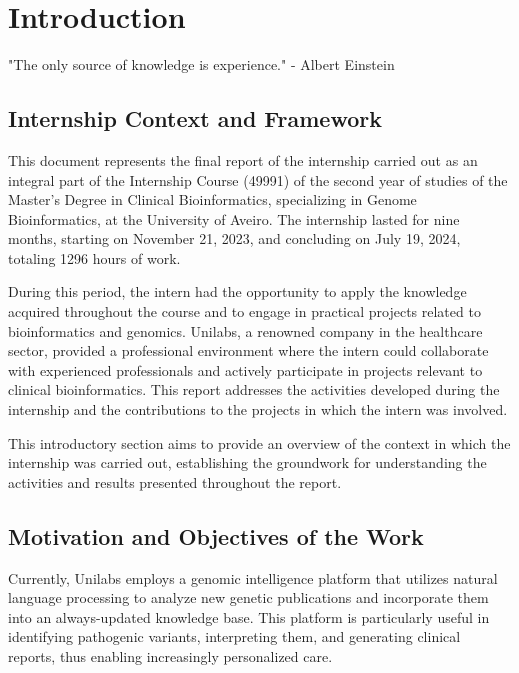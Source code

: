 \chapter{Introduction}
\label{chapter:introduction}

\begin{introduction}
    "The only source of knowledge is experience." - Albert Einstein
\end{introduction}



\section{Internship Context and Framework}

This document represents the final report of the internship carried out as an integral part of the Internship Course (49991) of the second year of studies of the Master's Degree in Clinical Bioinformatics, specializing in Genome Bioinformatics, at the University of Aveiro. The internship lasted for nine months, starting on November 21, 2023, and concluding on July 19, 2024, totaling 1296 hours of work.

During this period, the intern had the opportunity to apply the knowledge acquired throughout the course and to engage in practical projects related to bioinformatics and genomics. Unilabs, a renowned company in the healthcare sector, provided a professional environment where the intern could collaborate with experienced professionals and actively participate in projects relevant to clinical bioinformatics. This report addresses the activities developed during the internship and the contributions to the projects in which the intern was involved.

This introductory section aims to provide an overview of the context in which the internship was carried out, establishing the groundwork for understanding the activities and results presented throughout the report.


\section{Motivation and Objectives of the Work}

Currently, Unilabs employs a genomic intelligence platform that utilizes natural language processing to analyze new genetic publications and incorporate them into an always-updated knowledge base. This platform is particularly useful in identifying pathogenic variants, interpreting them, and generating clinical reports, thus enabling increasingly personalized care.

